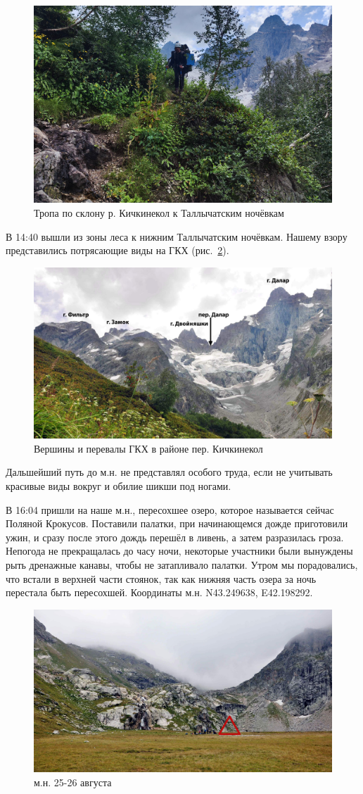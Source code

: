 \begin{figure}[h!]
	\centering
	\includegraphics[width=0.7\linewidth]{../pics/IMG_20240825_134744.jpg}
	\caption{Тропа по склону р. Кичкинекол к Таллычатским ночёвкам}
	\label{fig:IMG_20240825_134744.jpg}
\end{figure}


В 14:40 вышли из зоны леса к нижним Таллычатским ночёвкам. Нашему взору представились потрясающие виды на ГКХ (рис.~\ref{fig:DSC_0158.JPG}). 

\begin{figure}[h!]
	\centering
	\includegraphics[width=0.7\linewidth]{../pics/DSC_0158.jpg}
	\caption{Вершины и перевалы ГКХ в районе пер. Кичкинекол}
	\label{fig:DSC_0158.JPG}
\end{figure}

Дальшейший путь до м.н. не представлял особого труда, если не учитывать красивые виды вокруг и обилие шикши под ногами.

В 16:04 пришли на наше м.н., пересохшее озеро, которое называется сейчас Поляной Крокусов. Поставили  палатки, при начинающемся дожде приготовили ужин, и сразу после этого дождь перешёл в ливень, а затем разразилась гроза. Непогода не прекращалась до часу ночи, некоторые участники были вынуждены рыть дренажные канавы, чтобы не затапливало палатки. Утром мы порадовались, что встали в верхней части стоянок, так как нижняя часть озера за ночь перестала быть пересохшей.
Координаты м.н. N43.249638\degree, E42.198292\degree.

\begin{figure}[h!]
	\centering
	\includegraphics[width=0.7\linewidth]{../pics/DSC_0177.jpg}
	\caption{м.н. 25-26 августа}
	\label{fig:DSC_0177.JPG}
\end{figure}




\clearpage